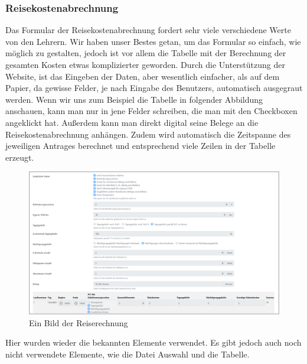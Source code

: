 \subsubsection{Reisekostenabrechnung}
Das Formular der Reisekostenabrechnung fordert sehr viele verschiedene Werte von den Lehrern. Wir haben unser Bestes getan, um das Formular so einfach, wie möglich zu gestalten, jedoch ist vor allem die Tabelle mit der Berechnung der gesamten Kosten etwas komplizierter geworden. Durch die Unterstützung der Website, ist das Eingeben der Daten, aber wesentlich einfacher, als auf dem Papier, da gewisse Felder, je nach Eingabe des Benutzers, automatisch ausgegraut werden. Wenn wir uns zum Beispiel die Tabelle in folgender Abbildung anschauen, kann man nur in jene Felder schreiben, die man mit den Checkboxen angeklickt hat. Außerdem kann man direkt digital seine Belege an die Reisekostenabrechnung anhängen. Zudem wird automatisch die Zeitspanne des jeweiligen Antrages berechnet und entsprechend viele Zeilen in der Tabelle erzeugt.
\begin{figure}[H]
	\centering
	\includegraphics[width=1\linewidth]{images/website/reiserechnung_1}
	\caption[Neuer Schulantrag]{Ein Bild der Reiserechnung}
	\label{fig:reiserechnungsite}
\end{figure}
Hier wurden wieder die bekannten Elemente verwendet. Es gibt jedoch auch noch nicht verwendete Elemente, wie die Datei Auswahl und die Tabelle.
